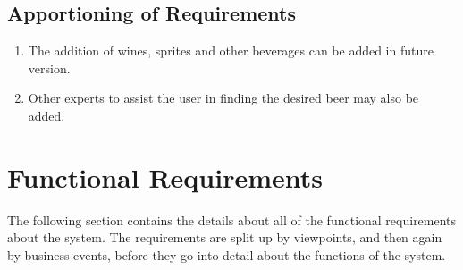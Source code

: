 \documentclass[]{article}
\begin{document}
\subsection{Apportioning of Requirements}
\label{sub:apportioning_of_requirements}
\begin{enumerate}
	\item The addition of wines, sprites and other beverages can be added in future version.
	\item Other experts to assist the user in finding the desired beer may also be added.
\end{enumerate}


\section{Functional Requirements}
\label{sec:functional_requirements}
The following section contains the details about all of the functional requirements about the system. The requirements are split up by viewpoints, and then again by business events, before they go into detail about the functions of the system.\\ 


\end{document}
